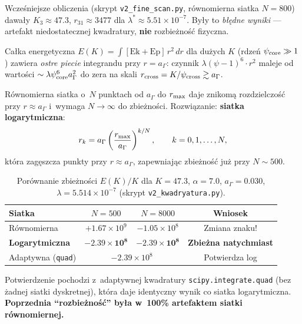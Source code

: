 \begin{remark}%
\label{rem:blad-kwadratury}
Wcześniejsze obliczenia (skrypt \texttt{v2\_fine\_scan.py},
równomierna siatka $N = 800$) dawały $K_3 \approx 47.3$,
$r_{31} \approx 3477$ dla $\lambda^* \approx 5.51 \times 10^{-7}$.
Były to \emph{błędne wyniki} — artefakt niedostatecznej kwadratury,
\textbf{nie} rozbieżność fizyczna.
\end{remark}

Całka energetyczna $E(K) = \int [\text{Ek} + \text{Ep}]\, r^2\, dr$
dla dużych $K$ (rdzeń $\psi_{\rm core} \gg 1$) zawiera
\emph{ostre piecie} integrandu przy $r = a_\Gamma$:
czynnik $\lambda(\psi-1)^6 \cdot r^2$ maleje od wartości
$\sim \lambda \psi_{\rm core}^6 a_\Gamma^2$ do zera na skali
$r_{\rm cross} = K / \psi_{\rm cross} \gtrsim a_\Gamma$.

Równomierna siatka o~$N$ punktach od $a_\Gamma$ do $r_{\rm max}$
daje znikomą rozdzielczość przy $r \approx a_\Gamma$
i~wymaga $N \to \infty$ do zbieżności.
Rozwiązanie: \textbf{siatka logarytmiczna}:
\begin{equation}\label{eq:log-grid}
    r_k = a_\Gamma \left(\frac{r_{\rm max}}{a_\Gamma}\right)^{k/N},
    \qquad k = 0, 1, \ldots, N,
\end{equation}
która zagęszcza punkty przy $r \approx a_\Gamma$, zapewniając
zbieżność już przy $N \sim 500$.

\begin{table}[h]
\centering
\small
\caption{Porównanie zbieżności $E(K)/K$ dla $K = 47.3$,
  $\alpha = 7.0$, $a_\Gamma = 0.030$, $\lambda = 5.514\times10^{-7}$
  (skrypt \texttt{v2\_kwadryatura.py}).}
\label{tab:kwadryatura-porownanie}
\begin{tabular}{@{}lccc@{}}
\toprule
\textbf{Siatka} & $N=500$ & $N=8000$ & \textbf{Wniosek} \\
\midrule
Równomierna    & $+1.67\times10^{9}$ & $-1.05\times10^{8}$ & Zmiana znaku! \\
\textbf{Logarytmiczna} & $\mathbf{-2.39\times10^{8}}$
                       & $\mathbf{-2.39\times10^{8}}$
                       & \textbf{Zbieżna natychmiast} \\
Adaptywna (\texttt{quad}) & \multicolumn{2}{c}{$-2.39\times10^{8}$}
                          & Potwierdza log \\
\bottomrule
\end{tabular}
\end{table}

Potwierdzenie pochodzi z~adaptywnej kwadratury
\texttt{scipy.integrate.quad} (bez żadnej siatki dyskretnej),
która daje identyczny wynik co siatka logarytmiczna.
\textbf{Poprzednia ``rozbieżność'' była w~100\% artefaktem
siatki równomiernej.}


